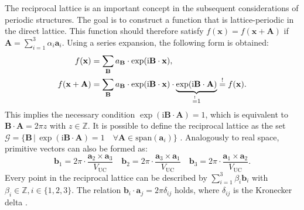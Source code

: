 The reciprocal lattice is an important concept in the subsequent considerations
of periodic structures. The goal is to construct a function that is lattice-periodic
in the direct lattice. This function should therefore satisfy
$f(\mathbf{x})=f(\mathbf{x}+\mathbf{A})$ if
$\mathbf{A}=\sum_{i=1}^{3}\alpha_{i}\mathbf{a}_{i}$. Using a series expansion,
the following form is obtained:
\begin{align}
	f(\mathbf{x})            & =\sum_{\mathbf{B}}a_{\mathbf{B}}\cdot \exp(\mathrm{i}\mathbf{B}\cdot\mathbf{x}), \notag                                                                                                           \\
	f(\mathbf{x}+\mathbf{A}) & =\sum_{\mathbf{B}}a_{\mathbf{B}}\cdot \exp(\mathrm{i}\mathbf{B}\cdot \mathbf{x})\cdot \underbrace{ \exp(\mathrm{i}\mathbf{B}\cdot \mathbf{A}) }_{ \stackrel{!}{=}1 }\stackrel{!}{=}f(\mathbf{x}).
\end{align}
This implies the necessary condition $\exp(\mathrm{i}\mathbf{B}\cdot \mathbf{A})=
1$, which is equivalent to $\mathbf{B}\cdot \mathbf{A}=2\pi z$ with
$z \in \mathbb{Z}$. It is possible to define the reciprocal lattice as the set $\mathcal{G}
=\{\mathbf{B}\,\vert\, \exp(\mathrm{i}\mathbf{B}\cdot \mathbf{A})=1 \quad \forall
\mathbf{A}\in \text{span}(\mathbf{a}_{i}) \}$ \autocite{Ashcroft}. Analogously to
real space, primitive vectors can also be formed as:
\begin{equation}
	\mathbf{b}_{1}= 2\pi \cdot \frac{\mathbf{a}_{2}\times \mathbf{a}_{3}}{V_{\mathrm{UC}}}
	\quad \mathbf{b}_{2}= 2\pi \cdot \frac{\mathbf{a}_{3}\times \mathbf{a}_{1}}{V_{\mathrm{UC}}}
	\quad \mathbf{b}_{3}= 2\pi \cdot \frac{\mathbf{a}_{1}\times \mathbf{a}_{2}}{V_{\mathrm{UC}}}
	. \label{eq:reciprocal_vectors}
\end{equation}
Every point in the reciprocal lattice can be described by $\sum_{i=1}^{3}\beta_{i}
\mathbf{b}_{i}$ with $\beta_{i}\in \mathbb{Z}, i\in\{1,2,3\}$. The relation
$\mathbf{b}_{i}\cdot \mathbf{a}_{j}=2 \pi \delta_{ij}$ holds, where $\delta_{ij}$
is the Kronecker delta \autocite{Ashcroft}.

